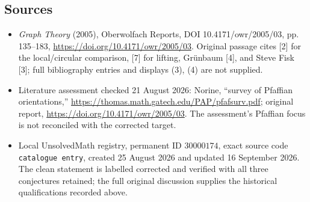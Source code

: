 \documentclass[11pt]{article}
\begin{document}
\subsection{Sources}
\begin{itemize}
\item \emph{Graph Theory} (2005), Oberwolfach Reports, DOI 10.4171/owr/2005/03, pp. 135--183, \url{https://doi.org/10.4171/owr/2005/03}. Original passage cites [2] for the local/circular comparison, [7] for lifting, Gr\"unbaum [4], and Steve Fisk [3]; full bibliography entries and displays (3), (4) are not supplied.
\item Literature assessment checked 21 August 2026: Norine, ``survey of Pfaffian orientations,'' \url{https://thomas.math.gatech.edu/PAP/pfafsurv.pdf}; original report, \url{https://doi.org/10.4171/owr/2005/03}. The assessment's Pfaffian focus is not reconciled with the corrected target.
\item Local UnsolvedMath registry, permanent ID $30000174$, exact source code \texttt{catalogue entry}, created 25 August 2026 and updated 16 September 2026. The clean statement is labelled corrected and verified with all three conjectures retained; the full original discussion supplies the historical qualifications recorded above.
\end{itemize}
\end{document}
